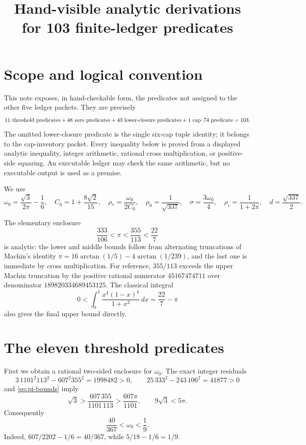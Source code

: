 \documentclass[11pt]{article}
\title{Hand-visible analytic derivations for 103 finite-ledger predicates}
\author{}
\date{}
\newcommand{\om}{\omega _0}
\newcommand{\rc}{\rho _c}
\newcommand{\rs}{\rho _*}
\begin{document}
\maketitle

\section{Scope and logical convention}

This note exposes, in hand-checkable form, the predicates not assigned to
the other five ledger packets.  They are precisely
\[
  11\ \hbox{threshold predicates}
  +48\ \hbox{zero predicates}
  +43\ \hbox{lower-closure predicates}
  +1\ \hbox{cap--74 predicate}=103.
\]
The omitted lower-closure predicate is the single six-cap tuple identity;
it belongs to the cap-inventory packet.  Every inequality below is proved
from a displayed analytic inequality, integer arithmetic, rational cross
multiplication, or positive-side squaring.  An executable ledger may check
the same arithmetic, but no executable output is used as a premise.

We use
\[
 \om=\frac{\sqrt3}{2\pi}-\frac16,
 \quad C_0=1+\frac{8\sqrt2}{15},
 \quad \rs=\frac{\om}{2C_0},
 \quad \rho _0=\frac1{\sqrt{337}},
 \quad \sigma=\frac{3\om}{4},
 \quad \rc=\frac1{1+2\pi},
 \quad d=\frac{\sqrt{337}}2.
\]

The elementary enclosure
\begin{equation}
 \frac{333}{106}<\pi<\frac{355}{113}<\frac{22}{7}
 \label{eq:pi-bounds}
\end{equation}
is analytic: the lower and middle bounds follow from alternating truncations
of Machin's identity
\(\pi=16\arctan(1/5)-4\arctan(1/239)\), and the last one is immediate by
cross multiplication.  For reference, \(355/113\) exceeds the upper
Machin truncation by the positive rational numerator
\(45167474711\) over denominator
\(189820334689453125\).  The classical integral
\[
 0<\int_0^1\frac{x^4(1-x)^4}{1+x^2}\,dx=\frac{22}{7}-\pi
\]
also gives the final upper bound directly.

\section{The eleven threshold predicates}

First we obtain a rational two-sided enclosure for \(\om\).  The exact
integer residuals
\[
 3\,1101^2 113^2-607^2 355^2=1998482>0,
 \qquad
 25\,333^2-243\,106^2=41877>0
\]
and \eqref{eq:pi-bounds} imply
\[
 \sqrt3>\frac{607\,355}{1101\,113}>\frac{607\pi}{1101},
 \qquad 9\sqrt3<5\pi.
\]
Consequently
\begin{equation}
 \frac{40}{367}<\om<\frac19.
 \label{eq:omega-bounds}
\end{equation}
Indeed, \(607/2202-1/6=40/367\), while
\(5/18-1/6=1/9\).
\end{document}
